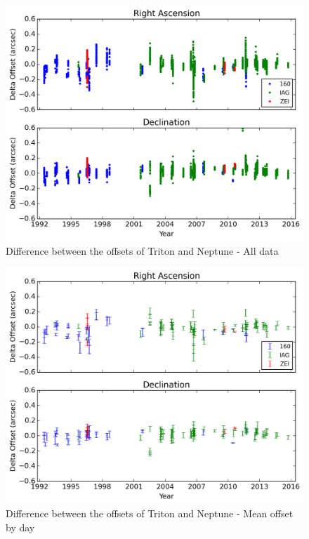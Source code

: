 \documentclass[12pt,a4paper]{report}
\begin{document}
\begin{figure}
\includegraphics[width=16.0cm]{Triton-Netuno_all.png} 
\caption{Difference between the offsets of Triton and Neptune - All data}
\label{Fig:triton-netuno-all}
\end{figure}
\begin{figure}
\includegraphics[width=16.0cm]{Triton-Netuno_media.png} 
\caption{Difference between the offsets of Triton and Neptune - Mean offset by day}
\label{Fig:triton-netuno-mean}
\end{figure}




\end{document}

